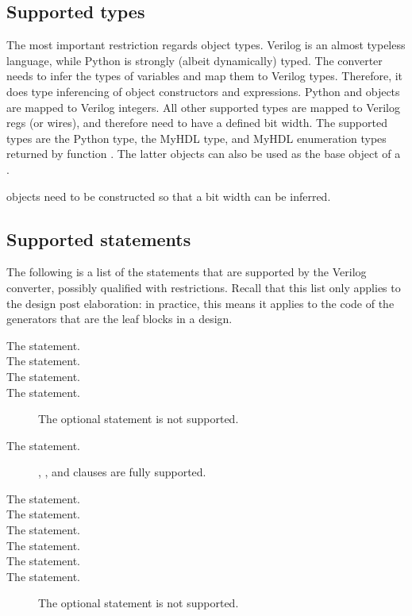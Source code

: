 \documentclass{howto}
\begin{document}
\subsection{Supported types}

The most important restriction regards object types. Verilog is an
almost typeless language, while Python is strongly (albeit
dynamically) typed. The converter needs to infer the types of
variables and map them to Verilog types. Therefore, it does type
inferencing of object constructors and expressions.  Python
 and  objects are mapped to Verilog
integers. All other supported types are mapped to Verilog regs (or
wires), and therefore need to have a defined bit width. The supported
types are the Python  type, the MyHDL  type,
and MyHDL enumeration types returned by function . The
latter objects can also be used as the base object of a
. 

 objects need to be constructed so that a bit
width can be inferred.

\subsection{Supported statements}

The following is a list of the statements that are supported by the
Verilog converter, possibly qualified with restrictions. Recall that
this list only applies to the design post elaboration: in practice,
this means it applies to the code of the generators that are the leaf
blocks in a design.

\begin{description}

\item[The  statement.]

\item[The  statement.]

\item[The  statement.]

\item[The  statement.]
The optional 
statement is not supported.

\item[The  statement.]
, , and  clauses
are fully supported.

\item[The  statement.]

\item[The  statement.]

\item[The  statement.]

\item[The  statement.]

\item[The  statement.] 

\item[The  statement.]
The optional 
statement is not supported.

\end{description}
\end{document}
